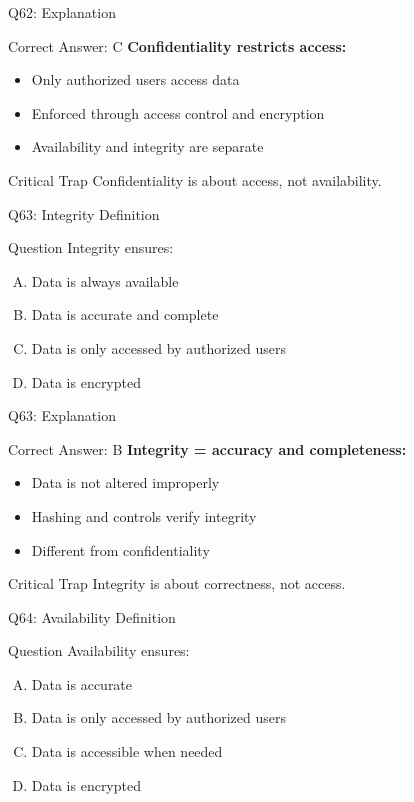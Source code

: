 \documentclass{beamer}
\begin{document}
	\begin{frame}{Q62: Explanation}
		\begin{block}{Correct Answer: C}
			\textbf{Confidentiality restricts access:}
			\begin{itemize}
				\item Only authorized users access data
				\item Enforced through access control and encryption
				\item Availability and integrity are separate
			\end{itemize}
		\end{block}
		\begin{alertblock}{Critical Trap}
			Confidentiality is about access, not availability.
		\end{alertblock}
	\end{frame}
	
	\begin{frame}{Q63: Integrity Definition}
		\begin{block}{Question}
			Integrity ensures:
		\end{block}
		\begin{enumerate}[(A)]
			\item Data is always available
			\item Data is accurate and complete
			\item Data is only accessed by authorized users
			\item Data is encrypted
		\end{enumerate}
	\end{frame}
	
	\begin{frame}{Q63: Explanation}
		\begin{block}{Correct Answer: B}
			\textbf{Integrity = accuracy and completeness:}
			\begin{itemize}
				\item Data is not altered improperly
				\item Hashing and controls verify integrity
				\item Different from confidentiality
			\end{itemize}
		\end{block}
		\begin{alertblock}{Critical Trap}
			Integrity is about correctness, not access.
		\end{alertblock}
	\end{frame}
	
	\begin{frame}{Q64: Availability Definition}
		\begin{block}{Question}
			Availability ensures:
		\end{block}
		\begin{enumerate}[(A)]
			\item Data is accurate
			\item Data is only accessed by authorized users
			\item Data is accessible when needed
			\item Data is encrypted
		\end{enumerate}
	\end{frame}
	
\end{document}
